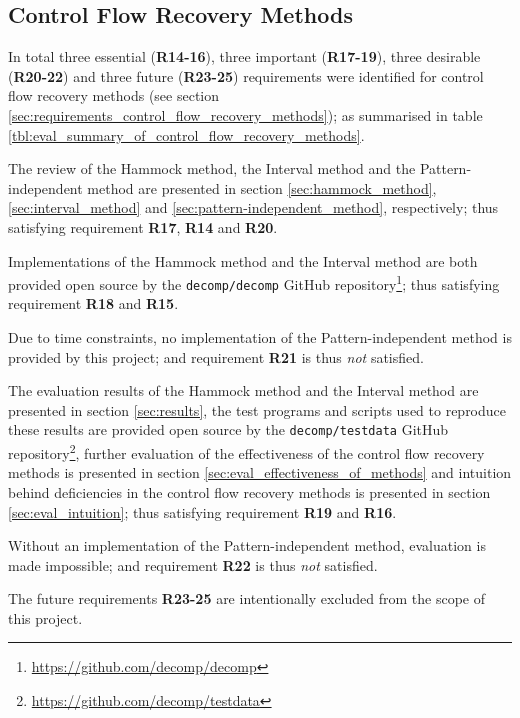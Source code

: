 
\subsection{Control Flow Recovery Methods}

In total three essential (\textbf{R14-16}), three important (\textbf{R17-19}), three desirable (\textbf{R20-22}) and three future (\textbf{R23-25}) requirements were identified for control flow recovery methods (see section \ref{sec:requirements_control_flow_recovery_methods}); as summarised in table \ref{tbl:eval_summary_of_control_flow_recovery_methods}.

The review of the Hammock method, the Interval method and the Pattern-independent method are presented in section \ref{sec:hammock_method}, \ref{sec:interval_method} and \ref{sec:pattern-independent_method}, respectively; thus satisfying requirement \textbf{R17}, \textbf{R14} and \textbf{R20}.

Implementations of the Hammock method and the Interval method are both provided open source by the \texttt{decomp/decomp} GitHub repository\footnote{\url{https://github.com/decomp/decomp}}; thus satisfying requirement \textbf{R18} and \textbf{R15}.

Due to time constraints, no implementation of the Pattern-independent method is provided by this project; and requirement \textbf{R21} is thus \textit{not} satisfied.

The evaluation results of the Hammock method and the Interval method are presented in section \ref{sec:results}, the test programs and scripts used to reproduce these results are provided open source by the \texttt{decomp/testdata} GitHub repository\footnote{\url{https://github.com/decomp/testdata}}, further evaluation of the effectiveness of the control flow recovery methods is presented in section \ref{sec:eval_effectiveness_of_methods} and intuition behind deficiencies in the control flow recovery methods is presented in section \ref{sec:eval_intuition}; thus satisfying requirement \textbf{R19} and \textbf{R16}.

Without an implementation of the Pattern-independent method, evaluation is made impossible; and requirement \textbf{R22} is thus \textit{not} satisfied.

The future requirements \textbf{R23-25} are intentionally excluded from the scope of this project.

